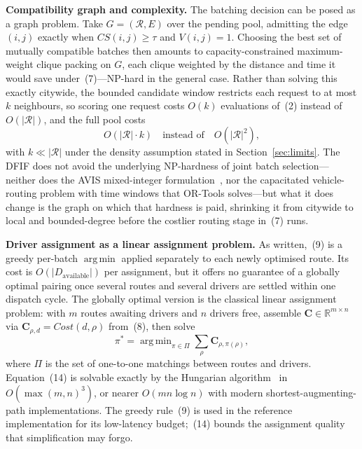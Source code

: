 \documentclass[conference]{IEEEtran}
\DeclareMathOperator*{\argmin}{arg\,min}
\begin{document}
\textbf{Compatibility graph and complexity.} The batching decision can be
posed as a graph problem. Take $G=(\mathcal{R},E)$ over the pending pool, admitting the edge $(i,j)$
exactly when $CS(i,j)\ge\tau$ and $V(i,j)=1$. Choosing the best set of
mutually compatible batches then amounts to capacity-constrained
maximum-weight clique packing on $G$, each clique weighted by the distance and
time it would save under~(7)---NP-hard in the general case.
Rather than solving this exactly citywide, the bounded candidate window
restricts each request to at most $k$ neighbours, so scoring one request costs
$O(k)$ evaluations of~(2) instead of $O(|\mathcal{R}|)$, and the full pool
costs
\begin{equation}
O(|\mathcal{R}|\cdot k)\quad\text{instead of}\quad O(|\mathcal{R}|^2),
\end{equation}
with $k\ll|\mathcal{R}|$ under the density assumption stated in
Section~\ref{sec:limits}. The DFIF does not avoid the underlying NP-hardness
of joint batch selection---neither does the AVIS mixed-integer
formulation~\cite{zhang2022}, nor the capacitated vehicle-routing problem with
time windows that OR-Tools solves---but what it does change is the graph on
which that hardness is paid, shrinking it from citywide to local and
bounded-degree before the costlier routing stage in~(7) runs.

\textbf{Driver assignment as a linear assignment problem.} As written,~(9) is a greedy per-batch $\argmin$ applied separately to each
newly optimised route. Its cost is $O(|D_{\text{available}}|)$ per assignment,
but it offers no guarantee of a globally optimal pairing once several routes
and several drivers are settled within one dispatch cycle. The globally optimal version is
the classical linear assignment problem: with $m$ routes awaiting drivers and $n$ drivers free, assemble
$\mathbf{C}\in\mathbb{R}^{m\times n}$ via
$\mathbf{C}_{\rho,d}=\mathit{Cost}(d,\rho)$ from~(8), then solve
\begin{equation}
\pi^{*}=\argmin_{\pi\in\Pi}\sum_{\rho}\mathbf{C}_{\rho,\pi(\rho)},
\end{equation}
where $\Pi$ is the set of one-to-one matchings between routes and drivers.
Equation~(14) is solvable exactly by the Hungarian
algorithm~\cite{kuhn1955} in $O(\max(m,n)^3)$, or nearer $O(mn\log n)$ with
modern shortest-augmenting-path implementations. The greedy rule~(9) is used in the
reference implementation for its low-latency budget;~(14) bounds the
assignment quality that simplification may forgo.
\end{document}
